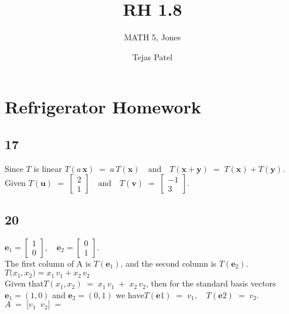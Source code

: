 \documentclass{article}
\title{RH 1.8}
\author{MATH 5, Jones}
\date{Tejas Patel}
\begin{document}
\maketitle
\section*{Refrigerator Homework}
\subsection*{17}
Since $T$ is linear $T(a\,\mathbf{x}) \;=\;a\,T(\mathbf{x}) \quad\text{and}\quad T(\mathbf{x}+\mathbf{y}) \;=\;T(\mathbf{x})+T(\mathbf{y}).$
\\Given $T(\mathbf{u}) \;=\;\begin{bmatrix}2\\1\end{bmatrix}\quad\text{and}\quad T(\mathbf{v}) \;=\;\begin{bmatrix}-1\\3\end{bmatrix}.$
\\
\subsection*{20}
$\mathbf{e}_1 = \begin{bmatrix}1\\0\end{bmatrix},\quad\mathbf{e}_2 = \begin{bmatrix}0\\1\end{bmatrix}.$\\The first column of A is $T(\mathbf{e}_1)$, and the second column is $T(\mathbf{e}_2)$.\\$T\bigl(x_1,x_2\bigr)=x_1\,v_1 + x_2\,v_2$\\Given that$T(x_1,x_2) \;=\;x_1\,v_{1}\;+\;x_2\,v_{2}$,
then for the standard basis vectors $\mathbf{e}_1=(1,0)$ and $\mathbf{e}_2=(0,1)$ we have$T(\mathbf{e}1) \;=\;v_{1},\quad T(\mathbf{e}2) \;=\;v_{2}$.\\$A \;=\;\bigl[v_{1}\;\;v_{2}\bigr]\;=\;$
\end{document}
